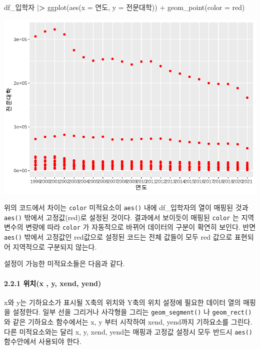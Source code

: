 \documentclass[
]{article}
\newenvironment{Shaded}{\begin{snugshade}}{\end{snugshade}}
\newcommand{\AttributeTok}[1]{\textcolor[rgb]{0.77,0.63,0.00}{#1}}
\newcommand{\ErrorTok}[1]{\textcolor[rgb]{0.64,0.00,0.00}{\textbf{#1}}}
\newcommand{\FunctionTok}[1]{\textcolor[rgb]{0.00,0.00,0.00}{#1}}
\newcommand{\NormalTok}[1]{#1}
\newcommand{\SpecialCharTok}[1]{\textcolor[rgb]{0.00,0.00,0.00}{#1}}
\newcommand{\StringTok}[1]{\textcolor[rgb]{0.31,0.60,0.02}{#1}}
\begin{document}
\begin{Shaded}
\begin{Highlighting}[]
\NormalTok{df\_입학자 }\SpecialCharTok{|}\ErrorTok{\textgreater{}} \FunctionTok{ggplot}\NormalTok{(}\FunctionTok{aes}\NormalTok{(}\AttributeTok{x =}\NormalTok{ 연도, }\AttributeTok{y =}\NormalTok{ 전문대학)) }\SpecialCharTok{+}
  \FunctionTok{geom\_point}\NormalTok{(}\AttributeTok{color =} \StringTok{\textquotesingle{}red\textquotesingle{}}\NormalTok{)}
\end{Highlighting}
\end{Shaded}

\includegraphics{chap3_files/figure-latex/unnamed-chunk-6-2.pdf}

위의 코드에서 차이는 \texttt{color} 미적요소이 \texttt{aes()} 내에 df\_입학자의 열이 매핑된 것과 \texttt{aes()} 밖에서 고정값(red)로 설정된 것이다. 결과에서 보이듯이 매핑된 \texttt{color} 는 지역 변수의 변량에 따라 \texttt{color} 가 자동적으로 바뀌어 데이터의 구분이 확연히 보인다. 반면 \texttt{aes()} 밖에서 고정값인 red값으로 설정된 코드는 전체 값들이 모두 red 값으로 표현되어 지역적으로 구분되지 않는다.

설정이 가능한 미적요소들은 다음과 같다.

\hypertarget{uxc704uxce58x-y-xend-yend}{%
\paragraph{2.2.1 위치(x , y, xend, yend)}\label{uxc704uxce58x-y-xend-yend}}

x와 y는 기하요소가 표시될 X축의 위치와 Y축의 위치 설정에 필요한 데이터 열의 매핑을 설정한다. 일부 선을 그리거나 사각형을 그리는 \texttt{geom\_segment()} 나 \texttt{geom\_rect()} 와 같은 기하요소 함수에서는 x, y 부터 시작하여 xend, yend까지 기하요소를 그린다. 다른 미적요소와는 달리 x, y, xend, yend는 매핑과 고정값 설정시 모두 반드시 \texttt{aes()} 함수안에서 사용되야 한다.
\end{document}
